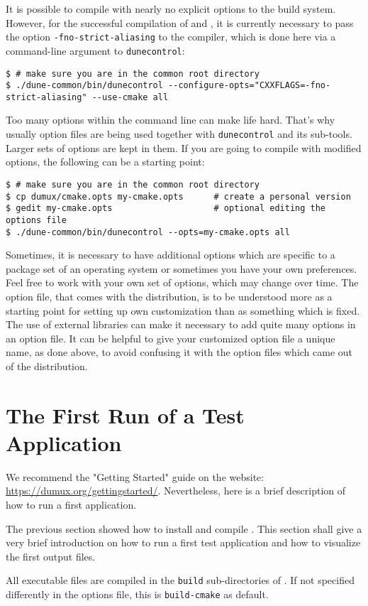It is possible to compile \Dumux with nearly no explicit options to the build system.
However, for the successful compilation of \Dune and \Dumux, it is currently necessary to pass
the option \texttt{-fno-strict-aliasing} to the \Cplusplus compiler,
which is done here via a command-line argument to \texttt{dunecontrol}:
\begin{lstlisting}[style=Bash]
$ # make sure you are in the common root directory
$ ./dune-common/bin/dunecontrol --configure-opts="CXXFLAGS=-fno-strict-aliasing" --use-cmake all
\end{lstlisting}

Too many options within the command line can make life hard. That's why usually option files are being used together with \texttt{dunecontrol} and its sub-tools.
Larger sets of options are kept in them. If you are going to compile with modified options, the following
can be a starting point:
\begin{lstlisting}[style=Bash]
$ # make sure you are in the common root directory
$ cp dumux/cmake.opts my-cmake.opts      # create a personal version
$ gedit my-cmake.opts                    # optional editing the options file
$ ./dune-common/bin/dunecontrol --opts=my-cmake.opts all
\end{lstlisting}

Sometimes, it is necessary to have additional options which
are specific to a package set of an operating system or
sometimes you have your own preferences.
Feel free to work with your own set of options, which may change over time.
The option file, that comes with the distribution, is to be understood more as a starting point
for setting up own customization than as something which is fixed.
The use of external libraries can make it necessary to add quite many options in an option file.
It can be helpful to give your customized option file a unique name, as done above,
to avoid confusing it with the option files which came out of the distribution.

\section{The First Run of a Test Application}
\label{quick-start-guide}

We recommend the "Getting Started" guide on the \Dumux website: \url{https://dumux.org/gettingstarted/}.
Nevertheless, here is a brief description of how to run a first application.

The previous section showed how to install and compile \Dumux. This section
shall give a very brief introduction on how to run a first test application and how
to visualize the first output files.\par
All executable files are compiled in the \texttt{build} sub-directories of \Dumux.
If not specified differently in the options file, this is \texttt{build-cmake} as default.

